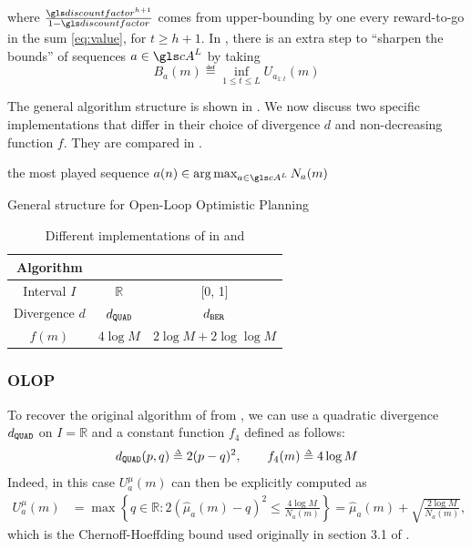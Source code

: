 \noindent
where $\frac{\discount^{h+1}}{1-\discount}$ comes from upper-bounding by one every reward-to-go in the sum \eqref{eq:value}, for $t\geq h+1$. In \citep{Bubeck2010}, there is an extra step to \enquote{sharpen the bounds} of sequences $a \in \cA^L$ by taking
\begin{equation}
\label{eq:Ba}
B_a(m) \eqdef \inf_{1 \leq t \leq L} U_{a_{1:t}}(m)
\end{equation}


The general algorithm structure is shown in .
We now discuss two specific implementations that differ in their choice of divergence $d$ and non-decreasing function $f$. They are compared in .

\begin{algorithm}[tp]
	\DontPrintSemicolon
	\Return the most played sequence $a(n) \in \argmax_{a\in \cA^L} N_a(m)$
	\caption{General structure for Open-Loop Optimistic Planning}
	\label{alg:kl-olop}
\end{algorithm}

\begin{table}[tp]
	\caption{Different implementations of  in \OLOP and \KLOLOP}
	\label{tab:comparison}
	\centering
	\begin{tabular}{ccc}
		\toprule
		Algorithm & \OLOP & \KLOLOP \\
		\midrule
		Interval $I$ & $\mathbb{R}$ & [0, 1] \\
		Divergence $d$ & $d_\texttt{QUAD}$ & $d_\texttt{BER}$ \\
		$f(m)$ & $4 \log M$ & $2\log M + 2 \log\log M$\\
		\bottomrule
	\end{tabular}
\end{table}

\subsubsection{\gls*{OLOP}}
\label{sec:kl-olop-olop}
To recover the original \OLOP algorithm of \citet{Bubeck2010} from , we can use a quadratic divergence $d_\texttt{QUAD}$ on $I=\mathbb{R}$ and a constant function $f_4$ defined as follows:
\begin{equation*}
\dquad(p,q) \eqdef 2(p-q)^2,\qquad
f_4(m) \eqdef 4 \log M
\end{equation*}
Indeed, in this case $U^{\mu}_a(m)$ can then be explicitly computed as
\begin{align*}
U^{\mu}_a(m) &= \max \left\{q\in \mathbb{R}: 2(\hat{\mu}_a(m) - q)^2 \leq \frac{4 \log M }{N_a(m)} \right\} = \hat{\mu}_a(m) + \sqrt{\frac{2 \log M}{N_a(m)}},
\end{align*}
which is the Chernoff-Hoeffding bound used originally in section 3.1 of \citep{Bubeck2010}.

